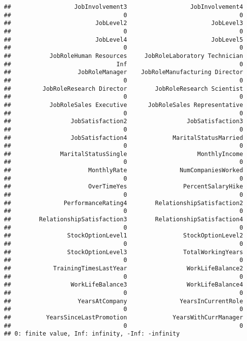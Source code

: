 \documentclass[
]{article}
\begin{document}
\begin{verbatim}
##                  JobInvolvement3                  JobInvolvement4 
##                                0                                0 
##                        JobLevel2                        JobLevel3 
##                                0                                0 
##                        JobLevel4                        JobLevel5 
##                                0                                0 
##           JobRoleHuman Resources     JobRoleLaboratory Technician 
##                              Inf                                0 
##                   JobRoleManager    JobRoleManufacturing Director 
##                                0                                0 
##         JobRoleResearch Director        JobRoleResearch Scientist 
##                                0                                0 
##           JobRoleSales Executive      JobRoleSales Representative 
##                                0                                0 
##                 JobSatisfaction2                 JobSatisfaction3 
##                                0                                0 
##                 JobSatisfaction4             MaritalStatusMarried 
##                                0                                0 
##              MaritalStatusSingle                    MonthlyIncome 
##                                0                                0 
##                      MonthlyRate               NumCompaniesWorked 
##                                0                                0 
##                      OverTimeYes                PercentSalaryHike 
##                                0                                0 
##               PerformanceRating4        RelationshipSatisfaction2 
##                                0                                0 
##        RelationshipSatisfaction3        RelationshipSatisfaction4 
##                                0                                0 
##                StockOptionLevel1                StockOptionLevel2 
##                                0                                0 
##                StockOptionLevel3                TotalWorkingYears 
##                                0                                0 
##            TrainingTimesLastYear                 WorkLifeBalance2 
##                                0                                0 
##                 WorkLifeBalance3                 WorkLifeBalance4 
##                                0                                0 
##                   YearsAtCompany               YearsInCurrentRole 
##                                0                                0 
##          YearsSinceLastPromotion             YearsWithCurrManager 
##                                0                                0 
## 0: finite value, Inf: infinity, -Inf: -infinity
\end{verbatim}
\end{document}
